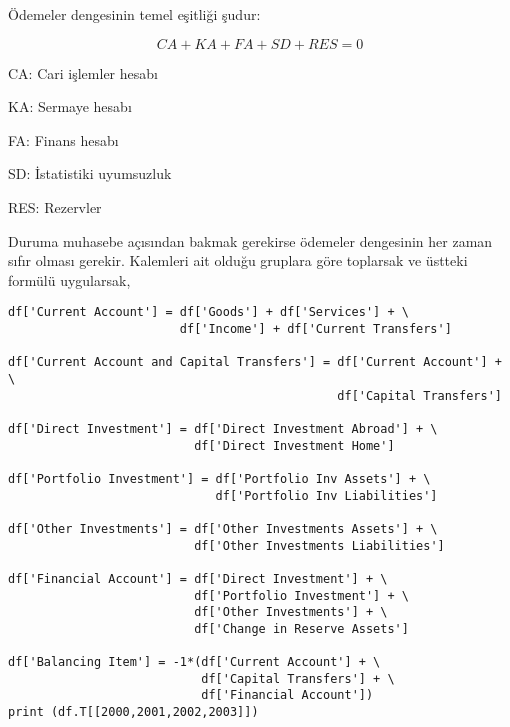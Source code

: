 \documentclass[12pt,fleqn]{article}\usepackage{../../common}
\begin{document}
Ödemeler dengesinin temel eşitliği şudur:

$$ CA + KA + FA + SD + RES = 0 $$

CA: Cari işlemler hesabı

KA: Sermaye hesabı

FA: Finans hesabı

SD: İstatistiki uyumsuzluk

RES: Rezervler

Duruma muhasebe açısından bakmak gerekirse ödemeler dengesinin her zaman sıfır
olması gerekir. Kalemleri ait olduğu gruplara göre toplarsak ve üstteki formülü
uygularsak,

\begin{verbatim}
df['Current Account'] = df['Goods'] + df['Services'] + \
                        df['Income'] + df['Current Transfers']

df['Current Account and Capital Transfers'] = df['Current Account'] + \
                                              df['Capital Transfers']

df['Direct Investment'] = df['Direct Investment Abroad'] + \
                          df['Direct Investment Home']

df['Portfolio Investment'] = df['Portfolio Inv Assets'] + \
                             df['Portfolio Inv Liabilities']

df['Other Investments'] = df['Other Investments Assets'] + \
                          df['Other Investments Liabilities']

df['Financial Account'] = df['Direct Investment'] + \
                          df['Portfolio Investment'] + \
                          df['Other Investments'] + \
                          df['Change in Reserve Assets']

df['Balancing Item'] = -1*(df['Current Account'] + \
                           df['Capital Transfers'] + \
                           df['Financial Account'])
print (df.T[[2000,2001,2002,2003]])
\end{verbatim}
\end{document}
